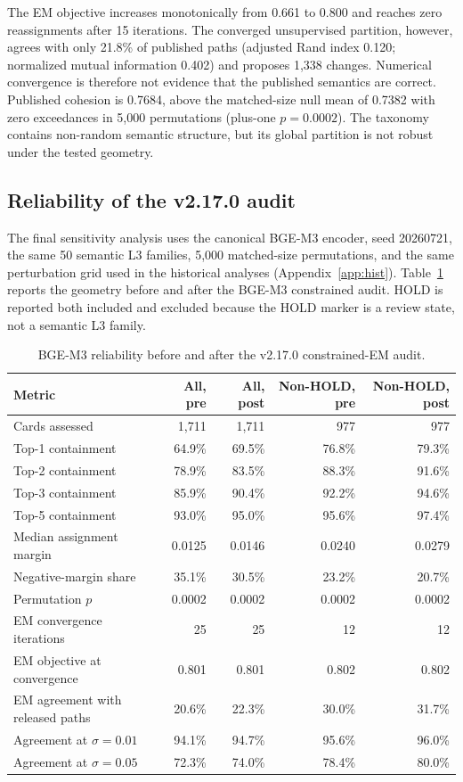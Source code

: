 \documentclass[11pt,a4paper]{article}
\begin{document}
The EM objective increases monotonically from 0.661 to 0.800 and reaches zero
reassignments after 15 iterations. The converged unsupervised partition,
however, agrees with only 21.8\% of published paths (adjusted Rand index 0.120;
normalized mutual information 0.402) and proposes 1,338 changes. Numerical
convergence is therefore not evidence that the published semantics are correct.
Published cohesion is 0.7684, above the matched-size null mean of 0.7382 with zero
exceedances in 5,000 permutations (plus-one $p=0.0002$). The taxonomy contains
non-random semantic structure, but its global partition is not robust under the
tested geometry.

\subsection{Reliability of the v2.17.0 audit}

The final sensitivity analysis uses the canonical BGE-M3 encoder, seed
20260721, the same 50 semantic L3 families, 5,000 matched-size permutations,
and the same perturbation grid used in the historical analyses (Appendix~\ref{app:hist}). Table~\ref{tab:v217-bge}
reports the geometry before and after the BGE-M3 constrained audit. HOLD is
reported both included and excluded because the HOLD marker is a review state,
not a semantic L3 family.

\begin{table}[ht]
\centering
\caption{BGE-M3 reliability before and after the v2.17.0 constrained-EM audit.}
\label{tab:v217-bge}
\begin{tabular}{lrrrr}
\toprule
Metric & All, pre & All, post & Non-HOLD, pre & Non-HOLD, post \\
\midrule
Cards assessed & 1,711 & 1,711 & 977 & 977 \\
Top-1 containment & 64.9\% & 69.5\% & 76.8\% & 79.3\% \\
Top-2 containment & 78.9\% & 83.5\% & 88.3\% & 91.6\% \\
Top-3 containment & 85.9\% & 90.4\% & 92.2\% & 94.6\% \\
Top-5 containment & 93.0\% & 95.0\% & 95.6\% & 97.4\% \\
Median assignment margin & 0.0125 & 0.0146 & 0.0240 & 0.0279 \\
Negative-margin share & 35.1\% & 30.5\% & 23.2\% & 20.7\% \\
Permutation $p$ & 0.0002 & 0.0002 & 0.0002 & 0.0002 \\
EM convergence iterations & 25 & 25 & 12 & 12 \\
EM objective at convergence & 0.801 & 0.801 & 0.802 & 0.802 \\
EM agreement with released paths & 20.6\% & 22.3\% & 30.0\% & 31.7\% \\
Agreement at $\sigma=0.01$ & 94.1\% & 94.7\% & 95.6\% & 96.0\% \\
Agreement at $\sigma=0.05$ & 72.3\% & 74.0\% & 78.4\% & 80.0\% \\
\bottomrule
\end{tabular}
\end{table}
\end{document}
